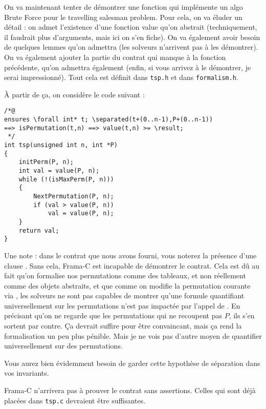 \documentclass[11pt,answers]{exam}
\begin{document}
\begin{questions}
\begin{parts}
    \end{parts}


    On va maintenant tenter de démontrer une fonction qui implémente un algo Brute Force pour le travelling salesman problem.
    Pour cela, on va éluder un détail : on admet l’existence d’une fonction value qu’on abstrait (techniquement, il faudrait plus d’arguments, mais ici on s’en fiche). On va également avoir besoin de quelques lemmes qu’on admettra (les solveurs n’arrivent pas à les démontrer).
    On va également ajouter la partie du contrat qui manque à la fonction précédente, qu’on admettra également (enfin, si vous arrivez à le démontrer, je serai impressionné).
    Tout cela est définit dans \texttt{tsp.h} et dans \texttt{formalism.h}.

    À partir de ça, on considère le code suivant :

    \begin{lstlisting}
/*@
ensures \forall int* t; \separated(t+(0..n-1),P+(0..n-1))
==> isPermutation(t,n) ==> value(t,n) >= \result;
 */
int tsp(unsigned int n, int *P)
{
    initPerm(P, n);
    int val = value(P, n);
    while (!(isMaxPerm(P, n)))
    {
        NextPermutation(P, n);
        if (val > value(P, n))
            val = value(P, n);
    }
    return val;
}
    \end{lstlisting}

    Une note : dans le contrat que nous avons fourni, vous noterez la présence d’une clause \code{\\separated}. Sans cela, Frama-C est incapable de démontrer le contrat. Cela est dû au fait qu’on formalise nos permutations comme des tableaux, et non réellement comme des objets abstraits, et que comme on modifie la permutation courante via , les solveurs ne sont pas capables de montrer qu’une formule quantifiant universellement sur les permutations n’est pas impactée par l’appel de . En précisant qu’on ne regarde que les permutations qui ne recoupent pas $P$, ils s’en sortent par contre.
    Ça devrait suffire pour être convaincant, mais ça rend la formalisation un peu plus pénible. Mais je ne vois pas d’autre moyen de quantifier universellement sur des permutations.

    Vous aurez bien évidemment besoin de garder cette hypothèse de séparation dans vos invariants.

    Frama-C n’arrivera pas à prouver le contrat sans assertions. Celles qui sont déjà placées dans \texttt{tsp.c} devraient être suffisantes.


\end{questions}
\end{document}
